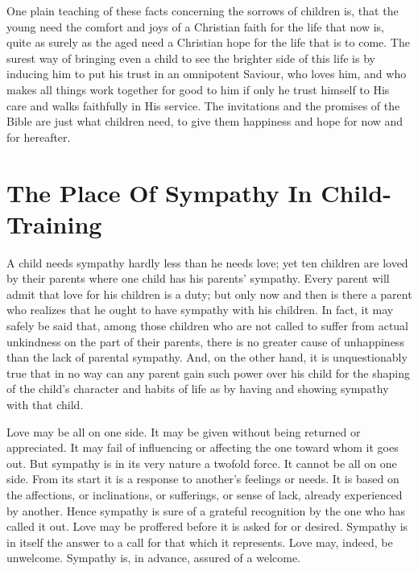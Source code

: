 \documentclass[
]{book}
\begin{document}
One plain teaching of these facts concerning the sorrows of children is, that the young need the comfort and joys of a Christian faith for the life that now is, quite as surely as the aged need a Christian hope for the life that is to come. The surest way of bringing even a child to see the brighter side of this life is by inducing him to put his trust in an omnipotent Saviour, who loves him, and who makes all things work together for good to him if only he trust himself to His care and walks faithfully in His service. The invitations and the promises of the Bible are just what children need, to give them happiness and hope for now and for hereafter.

\hypertarget{the-place-of-sympathy-in-child-training}{%
\chapter{The Place Of Sympathy In Child-Training}\label{the-place-of-sympathy-in-child-training}}

A child needs sympathy hardly less than he needs love; yet ten children are loved by their parents where one child has his parents' sympathy. Every parent will admit that love for his children is a duty; but only now and then is there a parent who realizes that he ought to have sympathy with his children. In fact, it may safely be said that, among those children who are not called to suffer from actual unkindness on the part of their parents, there is no greater cause of unhappiness than the lack of parental sympathy. And, on the other hand, it is unquestionably true that in no way can any parent gain such power over his child for the shaping of the child's character and habits of life as by having and showing sympathy with that child.

Love may be all on one side. It may be given without being returned or appreciated. It may fail of influencing or affecting the one toward whom it goes out. But sympathy is in its very nature a twofold force. It cannot be all on one side. From its start it is a response to another's feelings or needs. It is based on the affections, or inclinations, or sufferings, or sense of lack, already experienced by another. Hence sympathy is sure of a grateful recognition by the one who has called it out. Love may be proffered before it is asked for or desired. Sympathy is in itself the answer to a call for that which it represents. Love may, indeed, be unwelcome. Sympathy is, in advance, assured of a welcome.
\end{document}
